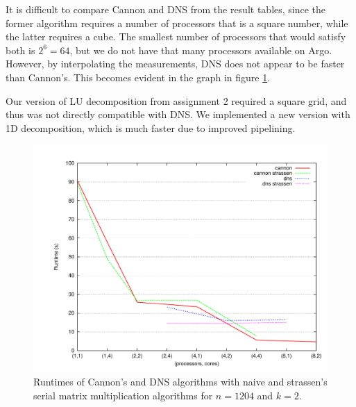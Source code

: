 \documentclass{article}
\begin{document}
It is difficult to compare Cannon and DNS from the result tables, since the former algorithm requires a number of processors that is a square number, while the latter requires a cube. The smallest number of processors that would satisfy both is $2^6 = 64$, but we do not have
 that many processors available on Argo. However, by interpolating the measurements, DNS does not appear to be faster than Cannon's. This becomes evident in the graph in figure \ref{fig:cannon-dns}.

Our version of LU decomposition from assignment 2 required a square grid, and thus was not directly compatible with DNS. We implemented a new version with
1D decomposition, which is much faster due to improved pipelining.


\begin{figure}[h]
	\centering
	\includegraphics[width=1.0\textwidth]{images/finished/cannon-dns-1024-2.pdf}
    \caption{Runtimes of Cannon's and DNS algorithms with naive and strassen's
    serial matrix multiplication algorithms for $n = 1204$ and $k = 2$.}
    \label{fig:cannon-dns}
\end{figure}

% 
% 
% 
\end{document}
